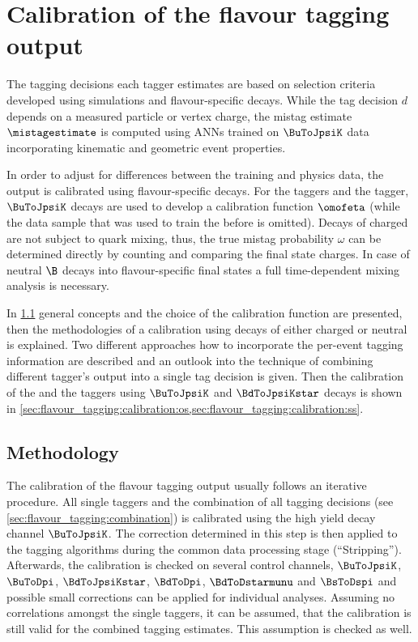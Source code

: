 \section{Calibration of the flavour tagging output}
\label{sec:flavour_tagging:calibration}

The tagging decisions each tagger estimates are based on selection criteria
developed using simulations and flavour-specific decays. While the tag decision
$d$ depends on a measured particle or vertex charge, the mistag estimate
$\mistagestimate$ is computed using \acp{ANN} trained on \sweighted $\BuToJpsiK$
data incorporating kinematic and geometric event properties.

In order to adjust for differences between the training and physics data, the
\ANN output is calibrated using flavour-specific decays. For the \OS taggers and
the \SSpi tagger, $\BuToJpsiK$ decays are used to develop a calibration function
$\omofeta$ (while the data sample that was used to train the \ANN before is
omitted). Decays of charged \Bmesons are not subject to quark mixing, thus, the
true mistag probability $\omega$ can be determined directly by counting and
comparing the final state charges. In case of neutral $\B$ decays into
flavour-specific final states a full time-dependent mixing analysis is
necessary.

In \cref{sec:flavour_tagging:calibration:method} general concepts and the choice
of the calibration function are presented, then the methodologies of a
calibration using decays of either charged or neutral \Bmesons is explained. Two
different approaches how to incorporate the per-event tagging information are
described and an outlook into the technique of combining different tagger's
output into a single tag decision is given. Then the calibration of the \OS and
the \SSpi taggers using $\BuToJpsiK$ and $\BdToJpsiKstar$ decays is shown in
\cref{sec:flavour_tagging:calibration:os,sec:flavour_tagging:calibration:ss}.

\subsection{Methodology}
\label{sec:flavour_tagging:calibration:method}

The calibration of the flavour tagging output usually follows an iterative
procedure. All single taggers and the combination of all \OS tagging decisions
(see \cref{sec:flavour_tagging:combination}) is calibrated using the high yield
decay channel $\BuToJpsiK$. The correction determined in this step is then
applied to the tagging algorithms during the common data processing stage
(\enquote{Stripping}). Afterwards, the calibration is checked on several control
channels, \ie $\BuToJpsiK$, $\BuToDpi$, $\BdToJpsiKstar$, $\BdToDpi$,
$\BdToDstarmunu$ and $\BsToDspi$ and possible small corrections can be applied
for individual analyses. Assuming no correlations amongst the single taggers, it
can be assumed, that the calibration is still valid for the combined tagging
estimates. This assumption is checked as well.


